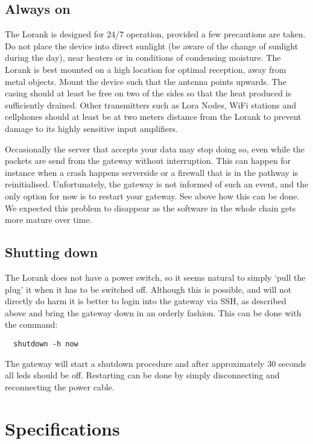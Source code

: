 \documentclass[12pt]{article}
\begin{document}
\subsection{Always on}
The Lorank is designed for 24/7 operation, provided a few precautions are
taken. Do not place the device into direct sunlight (be aware of the 
change of sunlight during the day), near heaters or in conditions of 
condensing moisture. The  Lorank is best mounted on a high location 
for optimal reception, away from metal objects. Mount the device such 
that the antenna points upwards.  The casing should at least be free 
on two of the sides so that the heat produced is sufficiently drained.
Other transmitters such as Lora Nodes, WiFi stations and cellphones 
should at least be at two meters distance from the Lorank to prevent
damage to its highly sensitive input amplifiers. 

Occasionally the server that accepts your data may stop doing so, even
while the packets are send from the gateway without interruption. 
This can happen for instance when a crash happens serverside or a firewall
that is in the pathway is reinitialised. Unfortunately, the gateway is 
not informed of such an event, and the only option for now is to restart
your gateway. See above how this can be done. We expected this
problem to disappear as the software in the whole chain gets more
mature over time.  

\subsection{Shutting down}
The Lorank does not have a power switch, so it seems natural to simply
`pull the plug' it when it has to be switched off. Although this is 
possible, and will not directly do harm it is better to login into 
the gateway via SSH, as described above and bring the gateway down 
in an orderly fashion. This can be done with the command:
\begin{verbatim}
  shutdown -h now
\end{verbatim}
The gateway will start a shutdown procedure and after approximately 
30 seconds all leds should be off. Restarting can be done by
simply disconnecting and reconnecting the power cable.


\section{Specifications}
\end{document}
